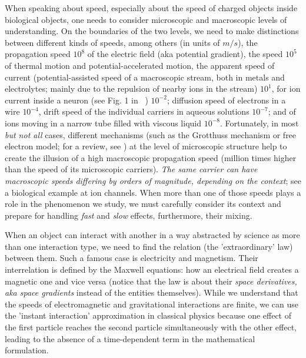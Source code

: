 {

When speaking about speed, especially about the speed of charged objects
inside biological objects, one needs to consider microscopic and macroscopic
levels of understanding. On the boundaries of the two levels, we need
to make distinctions between different kinds of speeds, among others
(in units of $m/s$), the propagation speed $10^{8}$ of the electric
field (aka potential gradient), the speed $10^{5}$ of thermal motion and potential-accelerated motion, the
apparent speed of current (potential-assisted speed of a macroscopic stream, both
in metals and electrolytes; mainly due to the repulsion of nearby ions in the stream) $10^{1}$,
 for ion current inside a neuron
(see Fig. 1 in ~\cite{ActionPotentialGenerationNatrium:2008}) $10^{-2}$;
diffusion speed of electrons in a wire $10^{-4}$, drift speed
 of the individual carriers in aqueous solutions $10^{-7}$; and
of ions moving in a narrow tube filled with viscous liquid $10^{-8}$. Fortunately,
in most \textit{but not all} cases, different mechanisms
(such as the Grotthuss mechanism or free electron model; for a review,
see \cite{GrotthussMechanism:2023}) at the level of microscopic
structure help to create the illusion of a high macroscopic propagation
speed (million times higher than the speed of its microscopic carriers).
\textit{The same carrier can have macroscopic speeds differing by orders of
magnitude, depending on the context};  see a biological example at
{ion channels}.
When more than one of those
speeds plays a role in the phenomenon we study, we must carefully
consider its context and prepare for handling \textit{fast}
and \textit{slow} effects, furthermore, their mixing.


When an object can interact with another in a way abstracted by science
as more than one interaction type, we need to find the relation (the 'extraordinary' law) between
them. Such a famous case is electricity and magnetism.
 Their interrelation
is defined by the Maxwell equations: how an electrical field creates
a magnetic one and vice versa (notice that the law is about their
\emph{space derivatives, aka space gradients} instead of the entities themselves). 
While we understand that the speeds of electromagnetic and gravitational
interactions are finite, we can use the 'instant interaction' approximation
in classical physics because one effect of the first particle
reaches the second particle simultaneously with the other effect,
leading to the absence of a time-dependent term in the mathematical
formulation.

}
